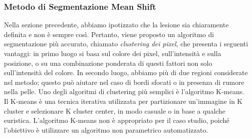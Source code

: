{\subsubsection{Metodo di Segmentazione Mean Shift}
Nella sezione precedente, abbiamo ipotizzato che la lesione sia chiaramente definita e non è sempre così. Pertanto, viene proposto un algoritmo di segmentazione più accurato, chiamato \textit{clustering dei pixel}, che presenta i seguenti vantaggi:
\newline 
in primo luogo si basa sul colore dei pixel, sull'intensità e sulla posizione, o su una combinazione ponderata di questi fattori non solo sull'intensità del colore.
\newline
In secondo luogo, abbiamo più di due regioni considerate nel metodo; questo può aiutare nel caso di bordi sfocati o in presenza di rumore nella pelle.
\newline
Uno degli algoritmi di clustering più semplici è l'algoritmo K-means. 
\newline 
Il K-means è una tecnica iterativa utilizzata per partizionare un'immagine in K cluster e selezionare K cluster center, in modo casuale o in base a qualche euristica. 
\newline
L'algoritmo K-means non è appropriato per il caso studio, poiché l'obiettivo è utilizzare un algoritmo non parametrico automatizzato.
\newpage
}
